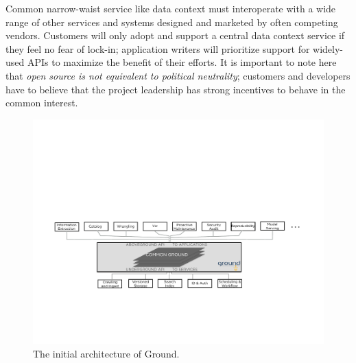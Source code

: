 \documentclass{sig-alternate}
\begin{document}
Common narrow-waist service like data context must interoperate with a wide range of other services and systems designed and marketed by often competing vendors.
Customers will only adopt and support a central data context service if they feel no fear of lock-in; application writers will prioritize support for widely-used APIs to maximize the benefit of their efforts. 
It is important to note here that \emph{open source is not equivalent to political neutrality}; customers and developers have to believe that the project leadership has strong incentives to behave in the common interest. 


\begin{figure}[th]
\centering
\includegraphics[width=0.75\linewidth]{groundarch.pdf}
\caption{The initial architecture of Ground.}
\label{fig:arch}
\end{figure}
\end{document}
